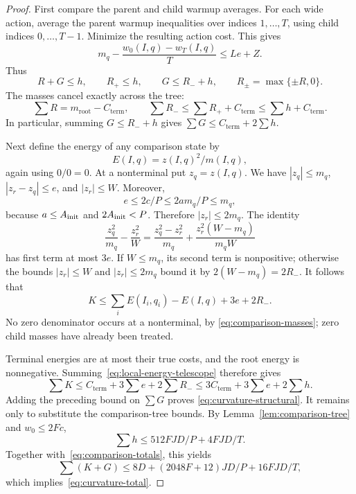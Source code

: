 \begin{proof}
First compare the parent and child warmup averages.  For each wide action,
average the parent warmup inequalities over indices $1,\ldots,T$, using
child indices $0,\ldots,T-1$.  Minimize the resulting action cost.  This gives
\[
 m_q-\frac{w_0(I,q)-w_T(I,q)}T\le Le+Z.
\]
Thus
\begin{equation}\label{eq:warmup-mass-slack}
 R+G\le h,\qquad R_+\le h,\qquad G\le R_-+h,
 \qquad R_\pm=\max\{\pm R,0\}.
\end{equation}
The masses cancel exactly across the tree:
\[
 \sum R=m_{\mathrm{root}}-C_{\mathrm{term}},
 \qquad
 \sum R_-\le\sum R_++C_{\mathrm{term}}
             \le\sum h+C_{\mathrm{term}}.
\]
In particular, summing $G\le R_-+h$ gives
$\sum G\le C_{\mathrm{term}}+2\sum h$.

Next define the energy of any comparison state by
\[
 E(I,q)=z(I,q)^2/m(I,q),
\]
again using $0/0=0$.  At a nonterminal put $z_q=z(I,q)$.  We have
$|z_q|\le m_q$, $|z_r-z_q|\le e$, and $|z_r|\le W$.  Moreover,
\[
 e\le2c/P\le2a m_q/P\le m_q,
\]
because $a\le A_{\rm init}$ and $2A_{\rm init}<P$.  Therefore
$|z_r|\le2m_q$.  The identity
\[
 \frac{z_q^2}{m_q}-\frac{z_r^2}{W}
 =\frac{z_q^2-z_r^2}{m_q}
  +\frac{z_r^2(W-m_q)}{m_qW}
\]
has first term at most $3e$.  If $W\le m_q$, its second term is nonpositive;
otherwise the bounds $|z_r|\le W$ and $|z_r|\le2m_q$ bound it by
$2(W-m_q)=2R_-$.  It follows that
\begin{equation}\label{eq:local-energy-telescope}
 K\le\sum_iE(I_i,q_i)-E(I,q)+3e+2R_-.
\end{equation}
No zero denominator occurs at a nonterminal, by
\eqref{eq:comparison-masses}; zero child masses have already been treated.

Terminal energies are at most their true costs, and the root energy is
nonnegative.  Summing~\eqref{eq:local-energy-telescope} therefore gives
\[
 \sum K\le C_{\mathrm{term}}+3\sum e+2\sum R_-
          \le3C_{\mathrm{term}}+3\sum e+2\sum h.
\]
Adding the preceding bound on $\sum G$ proves
\eqref{eq:curvature-structural}.  It remains only to substitute the
comparison-tree bounds.  By Lemma~\ref{lem:comparison-tree} and $w_0\le2Fc$,
\begin{equation}\label{eq:total-warmup-slack}
 \sum h\le512FJD/P+4FJD/T.
\end{equation}
Together with~\eqref{eq:comparison-totals}, this yields
\[
 \sum(K+G)\le8D+(2048F+12)JD/P+16FJD/T,
\]
which implies~\eqref{eq:curvature-total}.
\end{proof}

